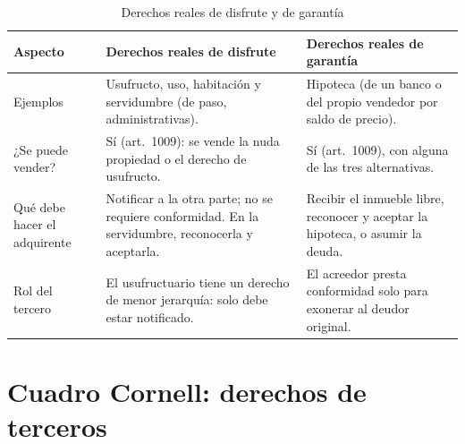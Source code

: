 \documentclass[12pt,oneside]{book}
\begin{document}
\begin{table}[H]
\centering
\caption{Derechos reales de disfrute y de garantía}
\small
\begin{tabularx}{\textwidth}{>{\raggedright\arraybackslash}p{2.6cm}>{\raggedright\arraybackslash}X>{\raggedright\arraybackslash}X}
\toprule
\textbf{Aspecto} & \textbf{Derechos reales de disfrute} & \textbf{Derechos reales de garantía} \\
\midrule
Ejemplos & Usufructo, uso, habitación y servidumbre (de paso, administrativas). & Hipoteca (de un banco o del propio vendedor por saldo de precio). \\
¿Se puede vender? & Sí (art.\ 1009): se vende la nuda propiedad o el derecho de usufructo. & Sí (art.\ 1009), con alguna de las tres alternativas. \\
Qué debe hacer el adquirente & Notificar a la otra parte; no se requiere conformidad. En la servidumbre, reconocerla y aceptarla. & Recibir el inmueble libre, reconocer y aceptar la hipoteca, o asumir la deuda. \\
Rol del tercero & El usufructuario tiene un derecho de menor jerarquía: solo debe estar notificado. & El acreedor presta conformidad solo para exonerar al deudor original. \\
\bottomrule
\end{tabularx}
\end{table}

\section*{Cuadro Cornell: derechos de terceros}
\end{document}

